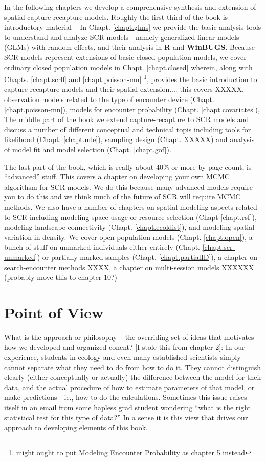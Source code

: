 In the following chapters we develop a comprehensive synthesis and extension of
spatial capture-recapture models.
Roughly the first third of the book is introductory material --
In Chapt. \ref{chapt.glms} we provide the basic analysis tools to understand and
analyze SCR models - namely generalized linear models (GLMs) with random effects, and their
analysis in {\bf R} and {\bf WinBUGS}.  Because SCR models represent extensions of
basic closed population models, we cover ordinary closed population
models in Chapt. \ref{chapt.closed} wherein, along with Chapts. \ref{chapt.scr0} and \ref{chapt.poisson-mn}
\footnote{might ought to put Modeling Encounter Probability
  as chapter 5 instead}, provides the basic introduction
to capture-recapture models and their spatial extension.... this
covers XXXXX.
observation models related to the type of encounter device (Chapt. \ref{chapt.poisson-mn}), models for encounter probability
(Chapt. \ref{chapt.covariates}),
The middle part of the book we extend capture-recapture to SCR models
and discuss a number of different conceptual and technical topis
including 
tools for likelihood (Chapt. \ref{chapt.mle}), sampling design
(Chapt. XXXXX) and analysis of model fit and model selection
(Chapt. \ref{chapt.gof}). 

The last part of the book, which is really about 40\% or more by page
count, is ``advanced'' stuff. This covers a chapter on developing your
own MCMC algorithsm for SCR models. We do this because many advanced
models require you to do this and we think much of the future of SCR
will require MCMC methods. 
We also have a number of chapters on spatial modeling aspects related
to SCR including modeling 
space usage or resource selection (Chapt \ref{chapt.rsf}), modeling
landscape connectivity (Chapt. \ref{chapt.ecoldist}), and modeling
spatial variation in density. 
We cover open population models (Chapt. \ref{chapt.open}),
a bunch of stuff on unmarked individuals either entirely (Chapt. \ref{chapt.scr-unmarked})
or partially marked samples (Chapt. \ref{chapt.partialID}), 
a chapter on search-encounter methods XXXX, a chapter on multi-session
models XXXXXX (probably move this to chapter 10?)


\section*{Point of View}
What is the approach or philosophy -- the overriding set of ideas that
motivates how we developed and organized conent?
[I stole this from chapter 2]:
In our experience, students in ecology and even many established
scientists simply cannot separate what they need to do from how to do
it.  They cannot distinguish clearly (either conceptually or actually)
the difference between the model for their data, and the actual
procedure of how to estimate parameters of that model, or make
predictions - ie., how to do the calculations. Sometimes this issue
raises itself in an email from some hapless grad student wondering
``what is the right statistical test for this type of data?''  In a
sense it is this view that drives our approach to developing elements
of this book.

